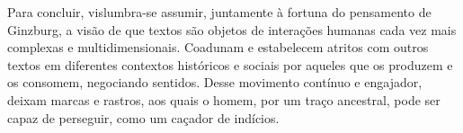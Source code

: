 \documentclass[portuguese]{textolivre}
\begin{document}
Para concluir, vislumbra-se assumir, juntamente à fortuna do pensamento de Ginzburg, a visão de que textos são objetos de interações humanas cada vez mais complexas e multidimensionais. Coadunam e estabelecem atritos com outros textos em diferentes contextos históricos e sociais por aqueles que os produzem e os consomem, negociando sentidos. Desse movimento contínuo e engajador, deixam marcas e rastros, aos quais o homem, por um traço ancestral, pode ser capaz de perseguir, como um caçador de indícios.


\printbibliography\label{sec-bib}



\begin{dataavailability}
\end{dataavailability}
\end{document}
